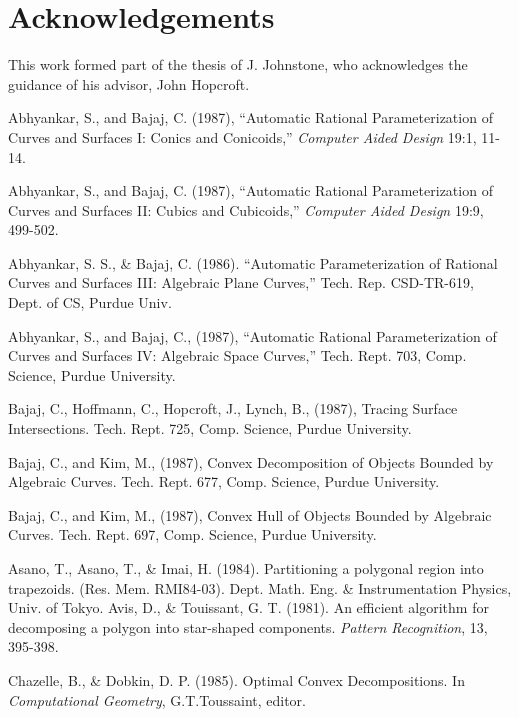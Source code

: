 \section{Acknowledgements}
This work formed part of the thesis of J. Johnstone, who acknowledges
the guidance of his advisor, John Hopcroft.
%
\begin{thebibliography}{Abhyankar 87b}
%
 Abhyankar, S., and Bajaj, C. (1987),
``Automatic Rational Parameterization of Curves and Surfaces I:
Conics and Conicoids,'' {\em Computer Aided Design}
19:1, 11-14.

 Abhyankar, S., and Bajaj, C. (1987),
``Automatic Rational Parameterization of Curves and Surfaces II:
Cubics and Cubicoids,'' {\em Computer Aided Design}
19:9, 499-502.

 Abhyankar, S. S., \& Bajaj, C. (1986).
``Automatic Parameterization of Rational Curves and Surfaces III:
Algebraic Plane Curves,''
Tech. Rep. CSD-TR-619, Dept. of CS, Purdue Univ.

 Abhyankar, S., and Bajaj, C., (1987),
``Automatic Rational Parameterization of Curves and Surfaces IV: Algebraic Space Curves,''
Tech. Rept. 703, Comp. Science, Purdue University.

 Bajaj, C., Hoffmann, C., Hopcroft, J., Lynch, B., (1987),
Tracing Surface Intersections.
Tech. Rept. 725, Comp. Science, Purdue University. 

 Bajaj, C., and Kim, M., (1987),
Convex Decomposition of Objects Bounded by Algebraic Curves.
Tech. Rept. 677, Comp. Science, Purdue University.

Bajaj, C., and Kim, M., (1987),
Convex Hull of Objects Bounded by Algebraic Curves.
Tech. Rept. 697, Comp. Science, Purdue University.

 Asano, T., Asano, T., \& Imai, H. (1984).
Partitioning a polygonal region into trapezoids.
(Res. Mem. RMI84-03). Dept. Math. Eng. \& Instrumentation Physics, Univ. of 
Tokyo.
%
 Avis, D., \& Touissant, G. T. (1981).
An efficient algorithm for decomposing a polygon into star-shaped
components.
{\em Pattern Recognition}, 13, 395-398.


 Chazelle, B., \& Dobkin, D. P. (1985).
Optimal Convex Decompositions.
In {\em Computational Geometry}, G.T.Toussaint, editor.


\end{thebibliography}
